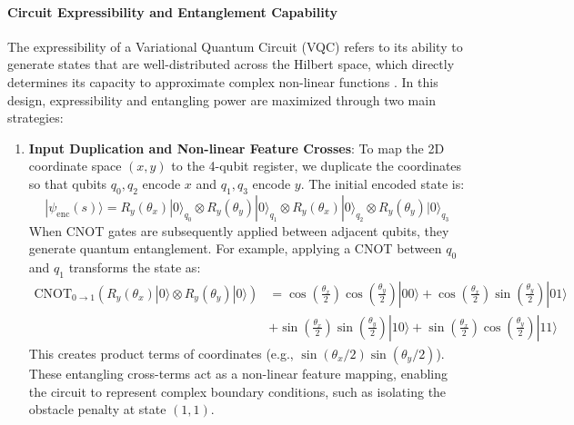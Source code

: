 \documentclass[12pt, a4paper]{article}
\begin{document}
\paragraph{Circuit Expressibility and Entanglement Capability}
The expressibility of a Variational Quantum Circuit (VQC) refers to its ability to generate states that are well-distributed across the Hilbert space, which directly determines its capacity to approximate complex non-linear functions \cite{sim2019}. In this design, expressibility and entangling power are maximized through two main strategies:
\begin{enumerate}
    \item \textbf{Input Duplication and Non-linear Feature Crosses}: 
    To map the 2D coordinate space $(x, y)$ to the 4-qubit register, we duplicate the coordinates so that qubits $q_0, q_2$ encode $x$ and $q_1, q_3$ encode $y$. The initial encoded state is:
    \begin{equation}
        |\psi_{\text{enc}}(s)\rangle = R_y(\theta_x)|0\rangle_{q_0} \otimes R_y(\theta_y)|0\rangle_{q_1} \otimes R_y(\theta_x)|0\rangle_{q_2} \otimes R_y(\theta_y)|0\rangle_{q_3}
    \end{equation}
    When CNOT gates are subsequently applied between adjacent qubits, they generate quantum entanglement. For example, applying a CNOT between $q_0$ and $q_1$ transforms the state as:
    \begin{align*}
        \text{CNOT}_{0\to1} \left(R_y(\theta_x)|0\rangle \otimes R_y(\theta_y)|0\rangle\right) &= \cos\left(\frac{\theta_x}{2}\right)\cos\left(\frac{\theta_y}{2}\right)|00\rangle + \cos\left(\frac{\theta_x}{2}\right)\sin\left(\frac{\theta_y}{2}\right)|01\rangle \\
        &+ \sin\left(\frac{\theta_x}{2}\right)\sin\left(\frac{\theta_y}{2}\right)|10\rangle + \sin\left(\frac{\theta_x}{2}\right)\cos\left(\frac{\theta_y}{2}\right)|11\rangle
    \end{align*}
    This creates product terms of coordinates (e.g., $\sin(\theta_x/2)\sin(\theta_y/2)$). These entangling cross-terms act as a non-linear feature mapping, enabling the circuit to represent complex boundary conditions, such as isolating the obstacle penalty at state $(1, 1)$.
    

\end{enumerate}
\end{document}
